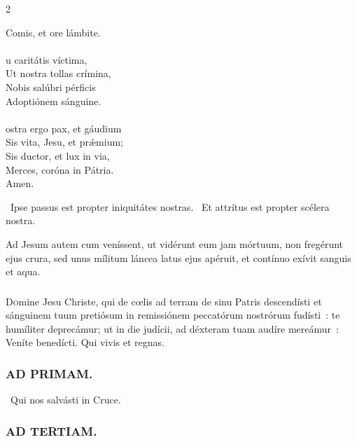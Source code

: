 \documentclass[9pt,twoside]{extarticle}
\begin{document}
\begin{multicols}{2}
{{{Comis, et ore lámbite.\\
\\
u caritátis víctima,\\
Ut nostra tollas crímina,\\
Nobis salúbri pérficis\\
Adoptiónem sánguine.\\
\\
ostra ergo pax, et gáudium\\
Sis vita, Jesu, et prǽmium;\\
Sis ductor, et lux in via,\\
Merces, coróna in Pátria.\\
Amen.

\begin{tightlist}{}
\item {}~Ipse passus est propter iniquitátes nostras. ~Et attrítus est propter scélera nostra.
\item {} Ad Jesum autem cum veníssent, ut vidérunt eum jam mórtuum, non fregérunt ejus crura, sed unus mílitum láncea latus ejus apéruit, et contínuo exívit sanguis et aqua.
\end{tightlist}

\subsubsection*{\center{}}
\lettrine{D}omine Jesu Christe, qui de cœlis ad terram de sinu Patris descendísti et sánguinem tuum pretiósum in remissiónem peccatórum nostrórum fudísti~: te humíliter deprecámur; ut in die judícii, ad déxteram tuam audíre mereámur~: Veníte benedícti. Qui vivis et regnas.

\begin{tightlist}{}
\item {}
\end{tightlist}

\subsubsection*{\center \textsc{AD PRIMAM.}}
\begin{tightlist}{}
\item {}~Qui nos salvásti in Cruce.
\end{tightlist}

\subsubsection*{\center \textsc{AD TERTIAM.}}
}}}
\end{multicols}
\end{document}
